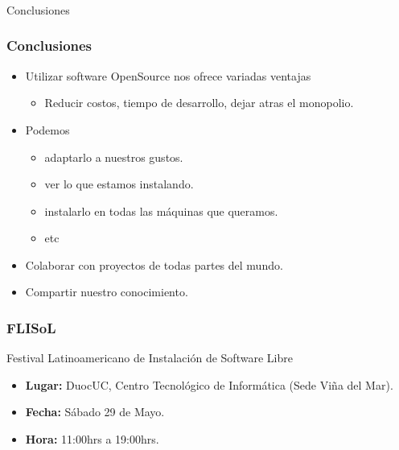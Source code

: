 \frame
{
\frametitle{}
\begin{center}
	\Huge{Conclusiones}
\end{center}
}

\frame
{
\frametitle{Conclusiones}
\begin{itemize}
	\item Utilizar software OpenSource nos ofrece variadas ventajas
	\begin{itemize}
		\item Reducir costos, tiempo de desarrollo, dejar atras el monopolio.
	\end{itemize}
	\item Podemos
	\begin{itemize}
		\item adaptarlo a nuestros gustos.
		\item ver lo que estamos instalando.
		\item instalarlo en todas las máquinas que queramos.
		\item etc
	\end{itemize}
	\item Colaborar con proyectos de todas partes del mundo.
	\item Compartir nuestro conocimiento.
\end{itemize}
}

\frame
{
\frametitle{FLISoL}
\Large{Festival Latinoamericano de Instalación de Software Libre}
\normalsize
\begin{center}
\end{center}
\begin{itemize}
	\item {\bf Lugar:} DuocUC, Centro Tecnológico de Informática (Sede Viña del Mar).
	\item {\bf Fecha:} Sábado 29 de Mayo.
	\item {\bf Hora: } 11:00hrs a 19:00hrs.
\end{itemize}
}
